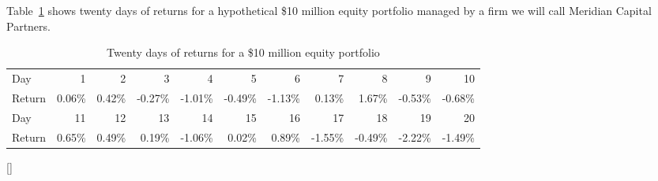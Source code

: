 \documentclass[../ai_in_finance]{subfiles}
\begin{document}
Table~\ref{tab:portfolio_returns} shows twenty days of returns for a hypothetical \$10 million equity portfolio managed by a firm we will call Meridian Capital Partners.

\begin{table}[htbp]
\centering
\begin{lrbox}{\bookmeasuredbox}
\begin{tabular}{lrrrrrrrrrr}
\toprule
Day & 1 & 2 & 3 & 4 & 5 & 6 & 7 & 8 & 9 & 10 \\
Return & 0.06\% & 0.42\% & -0.27\% & -1.01\% & -0.49\% & -1.13\% & 0.13\% & 1.67\% & -0.53\% & -0.68\% \\
\midrule
Day & 11 & 12 & 13 & 14 & 15 & 16 & 17 & 18 & 19 & 20 \\
Return & 0.65\% & 0.49\% & 0.19\% & -1.06\% & 0.02\% & 0.89\% & -1.55\% & -0.49\% & -2.22\% & -1.49\% \\
\bottomrule
\end{tabular}
\end{lrbox}
\ifdim\wd\bookmeasuredbox<0.65\linewidth
\setlength{\bookcapwidth}{0.65\linewidth}
\else
\setlength{\bookcapwidth}{\wd\bookmeasuredbox}
\fi
{}[\bookcapwidth]{
\usebox{\bookmeasuredbox}
}{
\caption{Twenty days of returns for a \$10 million equity portfolio}
\label{tab:portfolio_returns}
}
\end{table}
\end{document}
